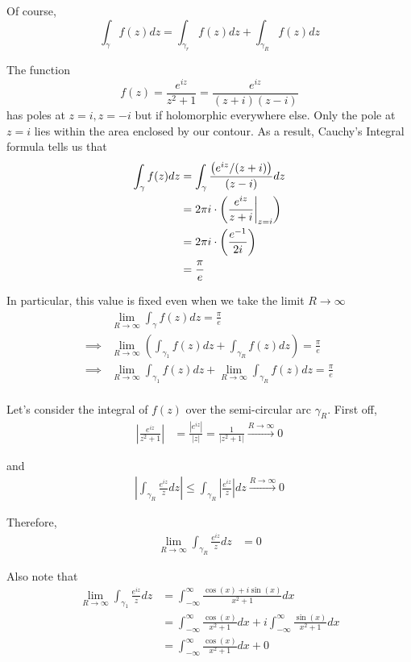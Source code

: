 \documentclass{article}
\newcommand{\restr}[2]{{%
  \left.\kern-\nulldelimiterspace %
  #1 %
  \vphantom{\big|} %
  \right|_{#2} %
  }}
\begin{document}
Of course, 
\[ \int_{\gamma} f(z) dz = \int_{{\gamma_{r}}} f(z) dz + \int_{{\gamma_{R}}} f(z) dz \]

The function 
\[ f(z) = \frac{e^{iz}}{z^2 + 1} = \frac{e^{iz}}{(z+i)(z-i)} \]
has poles at $z = i, z = -i$ but if holomorphic everywhere else. Only the pole at $z = i$ lies within the area enclosed by our contour. As a result, Cauchy's Integral formula tells us that 
\begin{align*}
  \int_{\gamma} f(z) dz &= \int_{\gamma} \frac{\left(e^{iz}/(z+i)\right)}{(z-i)} dz \\
  &= 2\pi i \cdot \left( \restr{\frac{e^{iz}}{z+i}}{z = i} \right) \\
  &= 2\pi i \cdot \left( \frac{e^{-1}}{2i} \right) \\
  &= \frac{\pi}{e}
\end{align*}

\vskip 0.5cm
In particular, this value is fixed even when we take the limit $R \rightarrow \infty$ 
\begin{align*}
  &\lim_{R \rightarrow \infty} \int_{\gamma} f(z) dz = \frac{\pi}{e} \\
  \implies &\lim_{R \rightarrow \infty} \left(\int_{{\gamma}_{1}} f(z) dz + \int_{{\gamma}_{R}} f(z) dz \right) = \frac{\pi}{e} \\
  \implies &\lim_{R \rightarrow \infty} \int_{{\gamma}_{1}} f(z) dz + \lim_{R \rightarrow \infty}  \int_{{\gamma}_{R}} f(z) dz  = \frac{\pi}{e} \\
\end{align*}

\vskip 0.5cm
Let's consider the integral of $f(z)$ over the semi-circular arc $\gamma_{R}$. First off, 
\begin{align*}
 \left| \frac{e^{iz}}{z^2 + 1} \right| &= \frac{\left|e^{iz}\right|}{\left|z\right|} = \frac{1}{\left|z^2 + 1\right|} \xrightarrow{R \rightarrow \infty} 0 
\end{align*}

and 
\begin{align*}
  \left| \int_{{\gamma_{R}}} \frac{e^{iz}}{z} dz \right| \leq \int_{{\gamma}_{R}} \left| \frac{e^{iz}}{z} \right| dz \xrightarrow{R \rightarrow \infty} 0 
\end{align*}

Therefore, 
\begin{align*}
  \lim_{R \rightarrow \infty} \int_{{\gamma_{R}}} \frac{e^{iz}}{z} dz &= 0
\end{align*}

\vskip 0.5cm
Also note that 
\begin{align*}
  \lim_{R \rightarrow \infty} \int_{{\gamma_{1}}} \frac{e^{iz}}{z} dz &= \int_{-\infty}^{\infty} \frac{\cos(x) + i \sin(x)}{x^2 + 1} dx \\
  &= \int_{-\infty}^{\infty} \frac{\cos(x)}{x^2 + 1} dx  + i\int_{-\infty}^{\infty} \frac{\sin(x)}{x^2 + 1} dx \\
  &= \int_{-\infty}^{\infty} \frac{\cos(x)}{x^2 + 1} dx  +  0
\end{align*}
\end{document}
